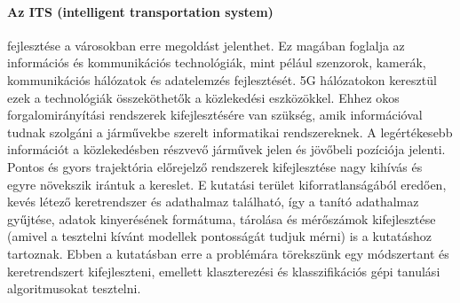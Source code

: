 \documentclass[acmtog, authorversion]{acmart}
\begin{document}
\paragraph{Az ITS (intelligent transportation system)} fejlesztése a városokban erre megoldást jelenthet. Ez magában foglalja az információs és
kommunikációs technológiák, mint pélául szenzorok, kamerák, kommunikációs hálózatok és adatelemzés fejlesztését. 5G hálózatokon
keresztül ezek a technológiák összeköthetők a közlekedési eszközökkel. Ehhez okos forgalomirányítási rendszerek kifejlesztésére
van szükség, amik információval tudnak szolgáni a járművekbe szerelt informatikai rendszereknek.
A legértékesebb információt a közlekedésben részvevő járművek jelen és jövőbeli pozíciója jelenti. Pontos és gyors trajektória 
előrejelző rendszerek kifejlesztése nagy kihívás és egyre növekszik irántuk a kereslet. E kutatási terület kiforratlanságából
eredően, kevés létező keretrendszer és adathalmaz található, így a tanító adathalmaz gyűjtése, adatok kinyerésének formátuma, tárolása
és mérőszámok kifejlesztése (amivel a tesztelni kívánt modellek pontosságát tudjuk mérni) is a kutatáshoz tartoznak.  
Ebben a kutatásban erre a problémára törekszünk egy módszertant és keretrendszert kifejleszteni, emellett klaszterezési és klasszifikációs
gépi tanulási algoritmusokat tesztelni.
\end{document}
